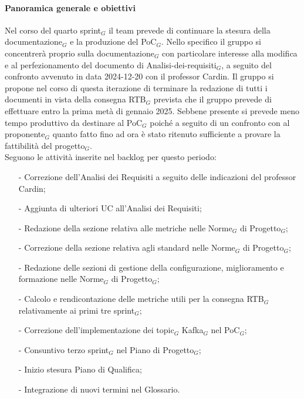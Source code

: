 \documentclass[10pt]{article}
\begin{document}
{{{{{    \paragraph{Panoramica generale e obiettivi}\mbox{}\vspace{0.4em}

    Nel corso del quarto sprint$_G$ il team prevede di continuare la stesura della documentazione$_G$ e la produzione del PoC$_G$. Nello specifico 
    il gruppo si concentrerà proprio sulla documentazione$_G$ con particolare interesse alla modifica e al perfezionamento del documento di
    Analisi-dei-requisiti$_G$, a seguito del confronto avvenuto in data 2024-12-20 con il professor Cardin. Il gruppo si propone nel corso di
    questa iterazione di terminare la redazione di tutti i documenti in vista della consegna RTB$_G$ prevista che il gruppo prevede di
    effettuare entro la prima metà di gennaio 2025. Sebbene presente si prevede meno tempo produttivo da destinare al PoC$_G$ poiché a seguito
    di un confronto con al proponente$_G$ quanto fatto fino ad ora è stato ritenuto sufficiente a provare la fattibilità del progetto$_G$.\\
    Seguono le attività inserite nel backlog per questo periodo:
    \vspace{-0.5em}
    \begin{itemize}
    \setlength\itemsep{-0.2em}
    \item [-] Correzione dell'Analisi dei Requisiti a seguito delle indicazioni del professor Cardin;
    \item [-] Aggiunta di ulteriori UC all'Analisi dei Requisiti;
    \item [-] Redazione della sezione relativa alle metriche nelle Norme$_G$ di Progetto$_G$;
    \item [-] Correzione della sezione relativa agli standard nelle Norme$_G$ di Progetto$_G$;
    \item [-] Redazione delle sezioni di gestione della configurazione, miglioramento e formazione nelle Norme$_G$ di Progetto$_G$;
    \item [-] Calcolo e rendicontazione delle metriche utili per la consegna RTB$_G$ relativamente ai primi tre sprint$_G$;
    \item [-] Correzione dell'implementazione dei topic$_G$ Kafka$_G$ nel PoC$_G$;
    \item [-] Consuntivo terzo sprint$_G$ nel Piano di Progetto$_G$;
    \item [-] Inizio stesura Piano di Qualifica;
    \item [-] Integrazione di nuovi termini nel Glossario.
    \end{itemize}

}}}}}
\end{document}
